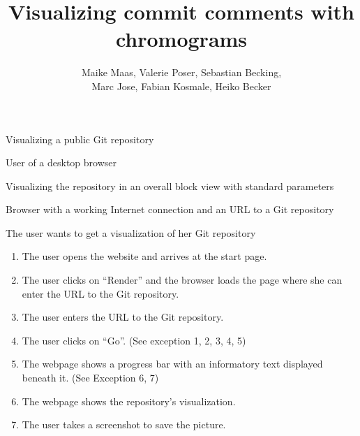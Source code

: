 \documentclass[11pt]{scrartcl}
\author{Maike Maas, Valerie Poser, Sebastian Becking,\\
Marc Jose, Fabian Kosmale, Heiko Becker}
\title{Visualizing commit comments with chromograms}
\begin{document}
\maketitle

\begin{description}[leftmargin=!,labelwidth=\widthof{\bfseries Frequency of use:}]
	\item[Use-case:] Visualizing a public Git repository 
	\item[Primary actor:] User of a desktop browser 
	\item[Goal in context:] Visualizing the repository in an overall block view with standard parameters 
	\item[Preconditions:] Browser with a working Internet connection and an URL to a Git repository
	\item[Trigger:] The user wants to get a visualization of her Git repository 

	\item[Scenario:]
		\begin{enumerate}[leftmargin=1.5em]
			\item The user opens the website and arrives at the start page.
			\item The user clicks on \enquote{Render} and the browser loads the page where
				she can enter the URL to the Git repository. 
			\item The user enters the URL to the Git repository. 
			\item The user clicks on \enquote{Go}. (See exception 1, 2, 3, 4, 5)
			\item The webpage shows a progress bar with an
				informatory text displayed beneath
				it. (See Exception 6, 7)
			\item The webpage shows the repository's visualization.
			\item The user takes a screenshot to save the picture. 
		\end{enumerate}


\end{description}
\end{document}
